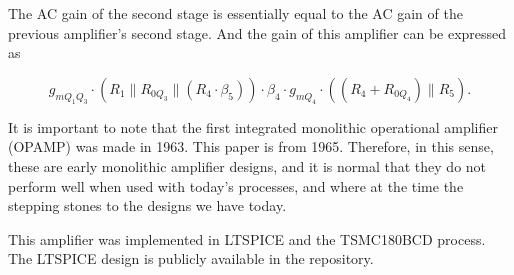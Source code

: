 \documentclass[12pt]{article}
\begin{document}
The AC gain of the second stage is essentially equal to the AC gain of the previous amplifier's second stage.
And the gain of this amplifier can be expressed as  

\[
g_{mQ_1Q_3} \cdot \left( R_1 \parallel R_{0Q_3} \parallel \left( R_4 \cdot \beta_5 \right) \right) \cdot \beta_4 \cdot g_{mQ_4} \cdot \left( \left( R_4 + R_{0Q_4} \right) \parallel R_5 \right).
\]


It is important to note that the first integrated monolithic operational amplifier (OPAMP) was made in 1963. This paper is from 1965. Therefore, in this sense, these are early monolithic amplifier designs, and it is normal that they do not perform well when used with today’s processes, and where at the time the stepping stones to the designs we have today.  

This amplifier was implemented in LTSPICE and the TSMC180BCD process. The LTSPICE design is publicly available in the repository.
\end{document}

